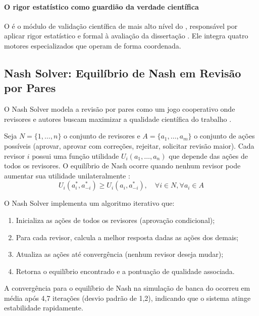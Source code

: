 \paragraph{O rigor estatístico como guardião da verdade científica} O  é o módulo de validação científica de mais alto nível
do \opencodeeco{}, responsável por aplicar rigor estatístico e formal à
avaliação da dissertação \cite{opencode2026ecosystem, opencode2026spec036}.
Ele integra quatro motores especializados que operam de forma coordenada.

\subsection{Nash Solver: Equilíbrio de Nash em Revisão por Pares}

O Nash Solver modela a revisão por pares como um jogo cooperativo onde
revisores e autores buscam maximizar a qualidade científica do trabalho
\cite{nash1950equilibrium, vonneumann1944theory}.

\begin{definicao}
Seja $N = \{1, \dots, n\}$ o conjunto de revisores e $A = \{a_1, \dots, a_m\}$
o conjunto de ações possíveis (aprovar, aprovar com correções, rejeitar,
solicitar revisão maior). Cada revisor $i$ possui uma função utilidade
$U_i(a_1, \dots, a_n)$ que depende das ações de todos os revisores.
O equilíbrio de Nash ocorre quando nenhum revisor pode aumentar sua utilidade
unilateralmente \cite{nash1950equilibrium}:
\begin{equation}
U_i(a_i^*, a_{-i}^*) \geq U_i(a_i, a_{-i}^*), \quad \forall i \in N, \forall a_i \in A
\end{equation}
\end{definicao}

O Nash Solver implementa um algoritmo iterativo que:

\begin{enumerate}
\item Inicializa as ações de todos os revisores (aprovação condicional);
\item Para cada revisor, calcula a melhor resposta dadas as ações dos demais;
\item Atualiza as ações até convergência (nenhum revisor deseja mudar);
\item Retorna o equilíbrio encontrado e a pontuação de qualidade associada.
\end{enumerate}

A convergência para o equilíbrio de Nash na simulação de banca do \opencodeeco{}
ocorreu em média após 4,7 iterações (desvio padrão de 1,2), indicando que o
sistema atinge estabilidade rapidamente.

